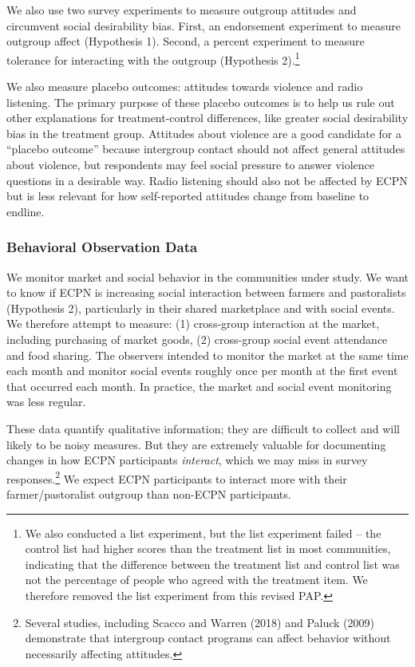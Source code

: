 \documentclass[
]{article}
\begin{document}
We also use two survey experiments to measure outgroup attitudes and
circumvent social desirability bias. First, an endorsement experiment to
measure outgroup affect (Hypothesis 1). Second, a percent experiment to
measure tolerance for interacting with the outgroup (Hypothesis
2).\footnote{We also conducted a list experiment, but the list
  experiment failed -- the control list had higher scores than the
  treatment list in most communities, indicating that the difference
  between the treatment list and control list was not the percentage of
  people who agreed with the treatment item. We therefore removed the
  list experiment from this revised PAP.}

We also measure placebo outcomes: attitudes towards violence and radio
listening. The primary purpose of these placebo outcomes is to help us
rule out other explanations for treatment-control differences, like
greater social desirability bias in the treatment group. Attitudes about
violence are a good candidate for a ``placebo outcome'' because
intergroup contact should not affect general attitudes about violence,
but respondents may feel social pressure to answer violence questions in
a desirable way. Radio listening should also not be affected by ECPN but
is less relevant for how self-reported attitudes change from baseline to
endline.

\hypertarget{behavioral-observation-data}{%
\subsubsection{Behavioral Observation
Data}\label{behavioral-observation-data}}

We monitor market and social behavior in the communities under study. We
want to know if ECPN is increasing social interaction between farmers
and pastoralists (Hypothesis 2), particularly in their shared
marketplace and with social events. We therefore attempt to measure: (1)
cross-group interaction at the market, including purchasing of market
goods, (2) cross-group social event attendance and food sharing. The
observers intended to monitor the market at the same time each month and
monitor social events roughly once per month at the first event that
occurred each month. In practice, the market and social event monitoring
was less regular.

These data quantify qualitative information; they are difficult to
collect and will likely to be noisy measures. But they are extremely
valuable for documenting changes in how ECPN participants
\emph{interact}, which we may miss in survey responses.\footnote{Several
  studies, including Scacco and Warren (2018) and Paluck (2009)
  demonstrate that intergroup contact programs can affect behavior
  without necessarily affecting attitudes.} We expect ECPN participants
to interact more with their farmer/pastoralist outgroup than non-ECPN
participants.
\end{document}
